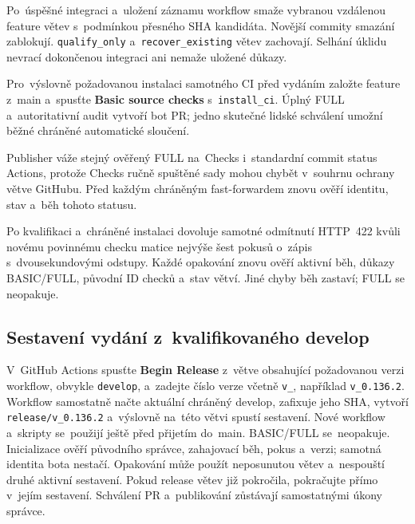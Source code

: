 \documentclass[11pt,a4paper]{article}
\newcommand{\ui}[1]{\textbf{#1}}
\newcommand{\codeword}[1]{\nolinkurl{#1}}
\begin{document}
Po~úspěšné integraci a~uložení záznamu workflow smaže vybranou vzdálenou
feature větev s~podmínkou přesného SHA kandidáta. Novější commity smazání
zablokují. \codeword{qualify_only} a~\codeword{recover_existing} větev
zachovají.
Selhání úklidu nevrací dokončenou integraci ani nemaže uložené důkazy.

Pro~výslovně požadovanou instalaci samotného CI před vydáním založte feature
z~main a~spusťte \ui{Basic source checks} s~\codeword{install_ci}.
Úplný FULL a~autoritativní audit vytvoří bot PR; jedno skutečné lidské
schválení umožní běžné chráněné automatické sloučení.

Publisher váže stejný ověřený FULL na~Checks i~standardní commit status
Actions, protože Checks ručně spuštěné sady mohou chybět v~souhrnu ochrany
větve GitHubu. Před každým chráněným fast-forwardem znovu ověří identitu,
stav a~běh tohoto statusu.

Po kvalifikaci a~chráněné instalaci dovoluje samotné odmítnutí HTTP~422 kvůli
novému povinnému checku matice nejvýše šest pokusů o~zápis s~dvousekundovými
odstupy. Každé opakování znovu ověří aktivní běh, důkazy BASIC/FULL, původní
ID checků a~stav větví. Jiné chyby běh zastaví; FULL se neopakuje.

\subsection{Sestavení vydání z~kvalifikovaného develop}

V~GitHub Actions spusťte \ui{Begin Release} z~větve obsahující požadovanou
verzi workflow, obvykle \codeword{develop}, a~zadejte číslo verze včetně
\codeword{v_}, například \codeword{v_0.136.2}. Workflow samostatně načte
aktuální chráněný develop, zafixuje jeho SHA, vytvoří
\codeword{release/v_0.136.2} a~výslovně na~této větvi spustí sestavení.
Nové workflow a~skripty se~použijí ještě před přijetím do~main.
BASIC/FULL se~neopakuje. Inicializace ověří původního správce, zahajovací
běh, pokus a~verzi; samotná identita bota nestačí. Opakování může použít
neposunutou větev a~nespouští druhé aktivní sestavení. Pokud release větev
již pokročila, pokračujte přímo v~jejím sestavení. Schválení PR
a~publikování zůstávají samostatnými úkony správce.
\end{document}
